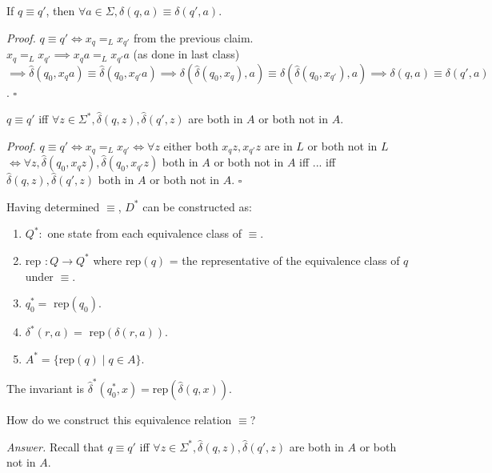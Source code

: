 \documentclass[a4paper]{article}
\newenvironment{proof}{\begin{breakbox}\textit{Proof.}}{\hfill$\square$\end{breakbox}}
\newenvironment{ans}{\begin{breakbox}\textit{Answer.}}{\end{breakbox}}
\newcommand{\nl}{\vspace{0.2cm}\\}
\newcommand{\hd}{\hat{\delta}}
\begin{document}
\begin{claim}
    If $q \equiv q'$, then $\forall a \in \Sigma, \delta(q, a) \equiv \delta(q', a)$.
\end{claim}

\begin{proof}
    $q \equiv q' \iff x_q =_L x_{q'}$ from the previous claim.\nl
    $x_q =_L x_{q'} \implies x_q a =_L x_{q'} a$ (as done in last class) $\implies \hd(q_0, x_qa) \equiv \hd(q_0, x_{q'}a) \implies \delta(\hd(q_0, x_q), a) \equiv \delta(\hd(q_0, x_{q'}), a)
    \implies \delta(q, a) \equiv \delta(q', a)$.
\end{proof}

\begin{claim}
    $q \equiv q'$ iff $\forall z \in \Sigma^*, \hd(q, z), \hd(q', z)$ are both in $A$ or both not in $A$.
\end{claim}

\begin{proof}
    $q \equiv q' \iff x_q =_L x_{q'} \iff \forall z$ either both $x_q z, x_{q'}z$ are in $L$ or both not in $L$ $\iff \forall z, \hd(q_0, x_qz), \hd(q_0, x_{q'}z)$ both in $A$ or both not in $A$
        iff ... iff $\hd(q, z), \hd(q', z)$ both in $A$ or both not in $A$.
\end{proof}

Having determined $\equiv$, $D^*$ can be constructed as:

\begin{enumerate}
    \item $Q^*:$ one state from each equivalence class of $\equiv$.
    \item rep $: Q \to Q^*$ where rep$(q)$ = the representative of the equivalence class of $q$ under $\equiv$.
    \item $q_0^* = $ rep$(q_0)$.
    \item $\delta^*(r, a) = $ rep$(\delta(r, a))$.
    \item $A^* = \{\mathrm{rep}(q) \mid q \in A\}$.
\end{enumerate}

The invariant is $\hd^*(q_0^*, x) = \mathrm{rep}(\hd(q, x))$.

\begin{ques}
    How do we construct this equivalence relation $\equiv$?
\end{ques}

\begin{ans}
    Recall that $q \equiv q'$ iff $\forall z \in \Sigma^*, \hd(q, z), \hd(q', z)$ are both in $A$ or both not in $A$.
\end{ans}
\end{document}
